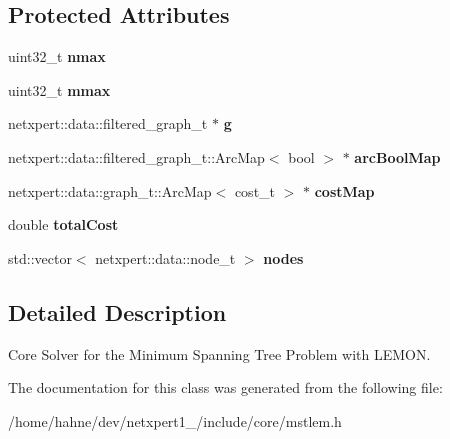 \subsection*{Protected Attributes}
\begin{DoxyCompactItemize}
\item 
uint32\+\_\+t {\bfseries nmax}\hypertarget{classnetxpert_1_1core_1_1MST__LEM_a3af5cdbf7bdb534934847206ce31fc57}{}\label{classnetxpert_1_1core_1_1MST__LEM_a3af5cdbf7bdb534934847206ce31fc57}

\item 
uint32\+\_\+t {\bfseries mmax}\hypertarget{classnetxpert_1_1core_1_1MST__LEM_ac5d7c2ae33b25ea6c1a8d21c3b899c79}{}\label{classnetxpert_1_1core_1_1MST__LEM_ac5d7c2ae33b25ea6c1a8d21c3b899c79}

\item 
netxpert\+::data\+::filtered\+\_\+graph\+\_\+t $\ast$ {\bfseries g}\hypertarget{classnetxpert_1_1core_1_1MST__LEM_ab62135ef6aa9743fa306cc580f19d0e5}{}\label{classnetxpert_1_1core_1_1MST__LEM_ab62135ef6aa9743fa306cc580f19d0e5}

\item 
netxpert\+::data\+::filtered\+\_\+graph\+\_\+t\+::\+Arc\+Map$<$ bool $>$ $\ast$ {\bfseries arc\+Bool\+Map}\hypertarget{classnetxpert_1_1core_1_1MST__LEM_afa414ca90eeccf83e5788bc6e26a1d93}{}\label{classnetxpert_1_1core_1_1MST__LEM_afa414ca90eeccf83e5788bc6e26a1d93}

\item 
netxpert\+::data\+::graph\+\_\+t\+::\+Arc\+Map$<$ cost\+\_\+t $>$ $\ast$ {\bfseries cost\+Map}\hypertarget{classnetxpert_1_1core_1_1MST__LEM_a879d338b891a8fec4c7b23cd391d87e8}{}\label{classnetxpert_1_1core_1_1MST__LEM_a879d338b891a8fec4c7b23cd391d87e8}

\item 
double {\bfseries total\+Cost}\hypertarget{classnetxpert_1_1core_1_1MST__LEM_a7d1cf08ff7bb320218cdb5feb5f029a7}{}\label{classnetxpert_1_1core_1_1MST__LEM_a7d1cf08ff7bb320218cdb5feb5f029a7}

\item 
std\+::vector$<$ netxpert\+::data\+::node\+\_\+t $>$ {\bfseries nodes}\hypertarget{classnetxpert_1_1core_1_1MST__LEM_a691f128604478290d6d96ed95db14cb2}{}\label{classnetxpert_1_1core_1_1MST__LEM_a691f128604478290d6d96ed95db14cb2}

\end{DoxyCompactItemize}


\subsection{Detailed Description}
Core Solver for the Minimum Spanning Tree Problem with L\+E\+M\+ON. 

The documentation for this class was generated from the following file\+:\begin{DoxyCompactItemize}
\item 
/home/hahne/dev/netxpert1\+\_/include/core/mstlem.\+h\end{DoxyCompactItemize}

